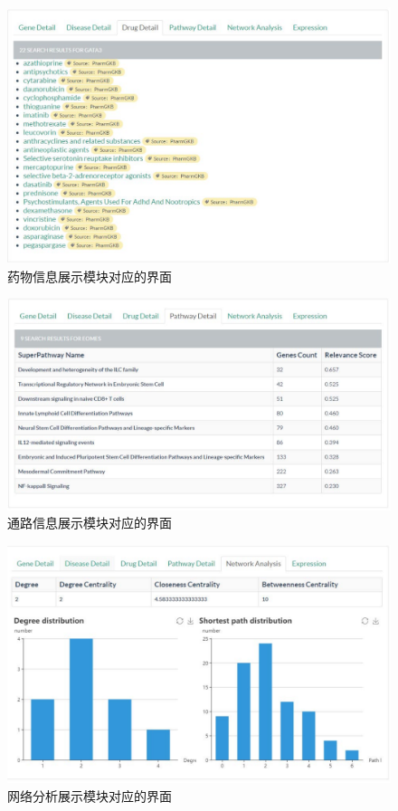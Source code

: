 \begin{figure}[!htbp]
\centering
\includegraphics[width = 1.0\textwidth]{juti3}
\caption[fig33]{药物信息展示模块对应的界面}
\label{juti3}
\end{figure}


\begin{figure}[!bhtp]
\centering
\includegraphics[width = 1.0\textwidth]{juti4}
\caption[fig33]{通路信息展示模块对应的界面}
\label{juti4}
\end{figure}

\begin{figure}[!htbp]
\centering
\includegraphics[width = 1.0\textwidth]{juti5}
\caption[fig33]{网络分析展示模块对应的界面}
\label{juti5}
\end{figure}

